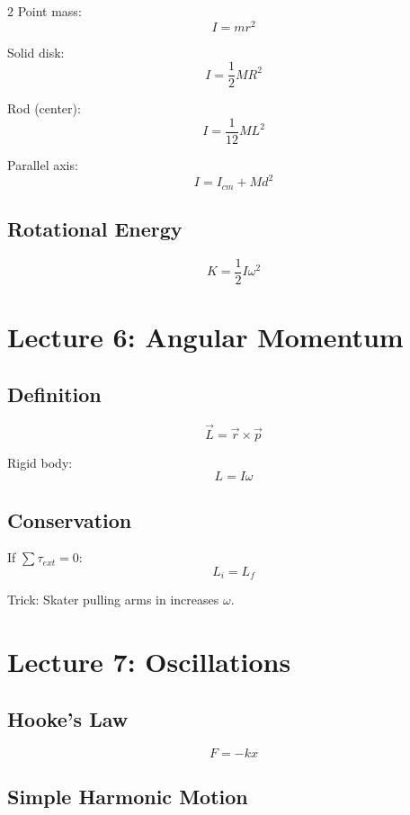 \documentclass[10pt,landscape]{article}
\begin{document}
\begin{multicols}{2}
Point mass:
\[
I = mr^2
\]

Solid disk:
\[
I = \frac{1}{2}MR^2
\]

Rod (center):
\[
I = \frac{1}{12}ML^2
\]

Parallel axis:
\[
I = I_{cm} + Md^2
\]

\subsection*{Rotational Energy}

\[
K = \frac{1}{2}I\omega^2
\]


\section*{Lecture 6: Angular Momentum}

\subsection*{Definition}

\[
\vec{L} = \vec{r}\times\vec{p}
\]

Rigid body:
\[
L = I\omega
\]

\subsection*{Conservation}

If $\sum\tau_{ext}=0$:
\[
L_i = L_f
\]

Trick: Skater pulling arms in increases $\omega$.


\section*{Lecture 7: Oscillations}

\subsection*{Hooke's Law}

\[
F = -kx
\]

\subsection*{Simple Harmonic Motion}


\end{multicols}
\end{document}
